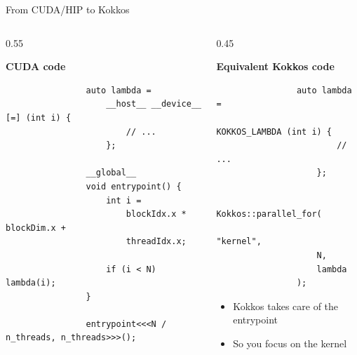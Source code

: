 \documentclass[
    aspectratio=169,
    \createHandout
]{beamer}
\begin{document}
\begin{frame}[fragile]{From CUDA/HIP to Kokkos}
    \begin{columns}[T]
        \begin{column}{0.55\linewidth}
            \begin{center}
                \textbf{CUDA code}
            \end{center}

            \vspace{-1em}

            \begin{verbatim}
                auto lambda =
                    __host__ __device__ [=] (int i) {
                        // ...
                    };

                __global__
                void entrypoint() {
                    int i =
                        blockIdx.x * blockDim.x +
                        threadIdx.x;

                    if (i < N) lambda(i);
                }

                entrypoint<<<N / n_threads, n_threads>>>();
            \end{verbatim}
        \end{column}
        \begin{column}{0.45\linewidth}
            \begin{center}
                \textbf{Equivalent Kokkos code}
            \end{center}

            \vspace{-1em}

            \begin{verbatim}
                auto lambda =
                    KOKKOS_LAMBDA (int i) {
                        // ...
                    };

                Kokkos::parallel_for(
                    "kernel",
                    N,
                    lambda
                );
            \end{verbatim}

            \pause

            \begin{itemize}
                \item Kokkos takes care of the entrypoint
                \item So you focus on the kernel
            \end{itemize}
        \end{column}
    \end{columns}
\end{frame}
\end{document}
